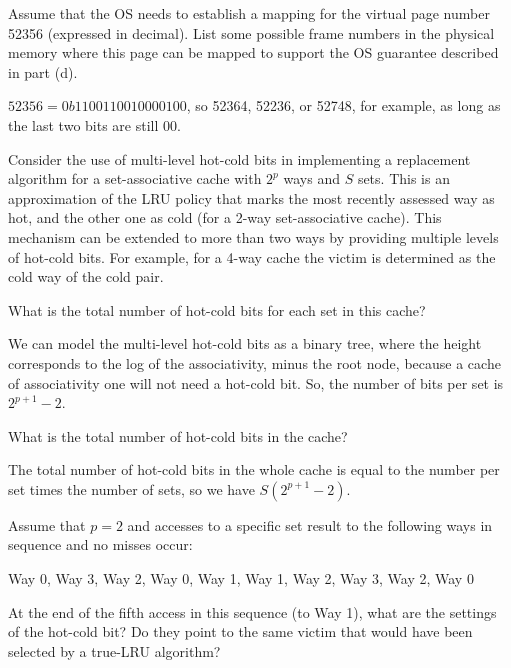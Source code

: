 \documentclass[12pt,letterpaper,twoside]{hmcpset}
\begin{document}
\begin{problem}[2e]
 Assume that the OS needs to establish a mapping for the virtual page number 52356 (expressed in decimal). List some possible frame numbers in the physical memory where this page can be mapped to support the OS guarantee described in part (d).
\end{problem}

\begin{solution}
 $52356 = 0b1100110010000100$, so 52364, 52236, or 52748, for example, as long as the last two bits are still 00.
\end{solution}

\begin{problem}[3]
 Consider the use of multi-level hot-cold bits in implementing a replacement algorithm for a set-associative cache with $2^p$ ways and $S$ sets. This is an approximation of the LRU policy that marks the most recently assessed way as hot, and the other one as cold (for a 2-way set-associative cache). This mechanism can be extended to more than two ways by providing multiple levels of hot-cold bits. For example, for a 4-way cache the victim is determined as the cold way of the cold pair.
\end{problem}

\begin{problem}[3a]
 What is the total number of hot-cold bits for each set in this cache?
\end{problem}

\begin{solution}
 We can model the multi-level hot-cold bits as a binary tree, where the height corresponds to the log of the associativity, minus the root node, because a cache of associativity one will not need a hot-cold bit.  So, the number of bits per set is $2^{p+1} - 2$.
\end{solution}

\begin{problem}[3b]
 What is the total number of hot-cold bits in the cache?
\end{problem}

\begin{solution}
 The total number of hot-cold bits in the whole cache is equal to the number per set times the number of sets, so we have $S\left(2^{p+1} - 2\right)$.
\end{solution}

\begin{problem}[3c]
 Assume that $p = 2$ and accesses to a specific set result to the following ways in sequence and no misses occur:

	Way 0, Way 3, Way 2, Way 0, Way 1, Way 1, Way 2, Way 3, Way 2, Way 0

At the end of the fifth access in this sequence (to Way 1), what are the settings of the hot-cold bit?  Do they point to the same victim that would have been selected by a true-LRU algorithm?
\end{problem}
\end{document}
